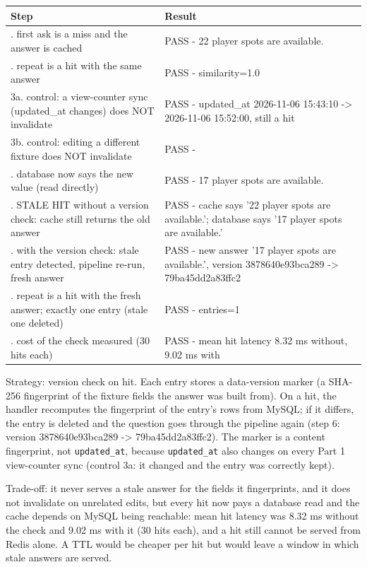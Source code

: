 \documentclass[11pt]{article}
\begin{document}
\begin{center}
{\scriptsize\setlength{\tabcolsep}{3pt}
\begin{tabular}{>{\raggedright\arraybackslash}p{3.1in}>{\raggedright\arraybackslash}p{3.0in}}
\toprule
\textbf{Step} & \textbf{Result} \\
\midrule
1. first ask is a miss and the answer is cached & PASS - 22 player spots are available. \\
2. repeat is a hit with the same answer & PASS - similarity=1.0 \\
3a. control: a view-counter sync (updated\_\allowbreak{}at changes) does NOT invalidate & PASS - updated\_\allowbreak{}at 2026-11-06 15:43:10 -> 2026-11-06 15:52:00, still a hit \\
3b. control: editing a different fixture does NOT invalidate & PASS - \\
4. database now says the new value (read directly) & PASS - 17 player spots are available. \\
5. STALE HIT without a version check: cache still returns the old answer & PASS - cache says '22 player spots are available.'; database says '17 player spots are available.' \\
6. with the version check: stale entry detected, pipeline re-run, fresh answer & PASS - new answer '17 player spots are available.', version 3878640e93bca289 -> 79ba45dd2a83ffc2 \\
7. repeat is a hit with the fresh answer; exactly one entry (stale one deleted) & PASS - entries=1 \\
8. cost of the check measured (30 hits each) & PASS - mean hit latency 8.32 ms without, 9.02 ms with \\
\bottomrule
\end{tabular}}
\end{center}
Strategy: version check on hit. Each entry stores a data-version marker (a SHA-256 fingerprint of the fixture fields the answer was built from). On a hit, the handler recomputes the fingerprint of the entry's rows from MySQL; if it differs, the entry is deleted and the question goes through the pipeline again (step 6: version 3878640e93bca289 -> 79ba45dd2a83ffc2). The marker is a content fingerprint, not \texttt{updated\_\allowbreak{}at}, because \texttt{updated\_\allowbreak{}at} also changes on every Part 1 view-counter sync (control 3a: it changed and the entry was correctly kept).

Trade-off: it never serves a stale answer for the fields it fingerprints, and it does not invalidate on unrelated edits, but every hit now pays a database read and the cache depends on MySQL being reachable: mean hit latency was 8.32 ms without the check and 9.02 ms with it (30 hits each), and a hit still cannot be served from Redis alone. A TTL would be cheaper per hit but would leave a window in which stale answers are served.
\end{document}
